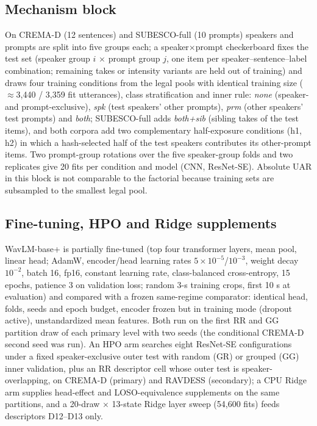 \documentclass{article}
\begin{document}
\subsection{Mechanism block}
\begingroup\sloppy
On CREMA-D (12 sentences) and SUBESCO-full (10 prompts) speakers and prompts are split into five groups each; a speaker$\times$prompt checkerboard fixes the test set (speaker group $i$ $\times$ prompt group $j$, one item per speaker--sentence--label combination; remaining takes or intensity variants are held out of training) and draws four training conditions from the legal pools with identical training size ($\approx$3,440 / 3,359 fit utterances), class stratification and inner rule: \emph{none} (speaker- and prompt-exclusive), \emph{spk} (test speakers' other prompts), \emph{prm} (other speakers' test prompts) and \emph{both}; SUBESCO-full adds \emph{both+sib} (sibling takes of the test items), and both corpora add two complementary half-exposure conditions (h1, h2) in which a hash-selected half of the test speakers contributes its other-prompt items.
Two prompt-group rotations over the five speaker-group folds and two replicates give 20 fits per condition and model (CNN, ResNet-SE).
Absolute UAR in this block is not comparable to the factorial because training sets are subsampled to the smallest legal pool.\par\endgroup

\subsection{Fine-tuning, HPO and Ridge supplements}
WavLM-base+ is partially fine-tuned (top four transformer layers, mean pool, linear head; AdamW, encoder/head learning rates $5\times10^{-5}$/$10^{-3}$, weight decay $10^{-2}$, batch 16, fp16, constant learning rate, class-balanced cross-entropy, 15 epochs, patience 3 on validation loss; random 3-s training crops, first 10 s at evaluation) and compared with a frozen same-regime comparator: identical head, folds, seeds and epoch budget, encoder frozen but in training mode (dropout active), unstandardized mean features.
Both run on the first RR and GG partition draw of each primary level with two seeds (the conditional CREMA-D second seed was run).
An HPO arm searches eight ResNet-SE configurations under a fixed speaker-exclusive outer test with random (GR) or grouped (GG) inner validation, plus an RR descriptor cell whose outer test is speaker-overlapping, on CREMA-D (primary) and RAVDESS (secondary); a CPU Ridge arm supplies head-effect and LOSO-equivalence supplements on the same partitions, and a 20-draw $\times$ 13-state Ridge layer sweep (54,600 fits) feeds descriptors D12--D13 only.
\end{document}

